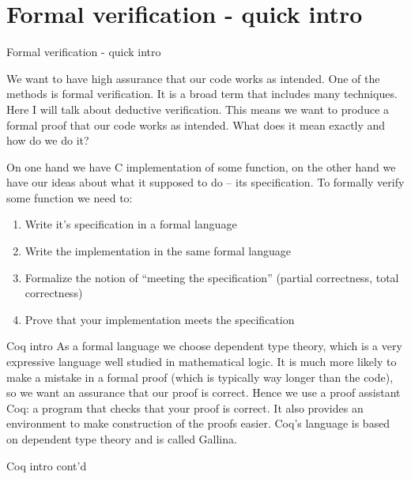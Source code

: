 \documentclass{beamer}
\begin{document}
\section{Formal verification - quick intro}
\begin{frame}{Formal verification - quick intro}
 
  We want to have high assurance that our code works as intended. One of the methods is formal verification. It is a broad term that includes many techniques. Here I will talk about deductive verification. This means we want to produce a formal proof that our code works as intended. What does it mean exactly and how do we do it?
  
  \bigskip
  
   On one hand we have C implementation of some function,
   on the other hand we have our ideas about what it supposed to do -- its specification. To formally verify some function we need to:
   
  \begin{enumerate}
  \item Write it's specification in a formal language  
  \item Write the implementation in the same formal language
  \item Formalize the notion of ``meeting the specification'' (partial correctness, total correctness)
  \item Prove that your implementation meets the specification
  \end{enumerate}
\end{frame}

\begin{frame}{Coq intro}
 As a formal language we choose dependent type theory, which is a very expressive language well studied in mathematical logic. It is much more likely to make a mistake in a formal proof (which is typically way longer than the code), so we want an assurance that our proof is correct. Hence we use a proof assistant Coq: a program that checks that your proof is correct. It also provides an environment to make construction of the proofs easier. Coq's language is based on dependent type theory and is called Gallina.
  
\end{frame}
\begin{frame}{Coq intro cont'd}
  
 
  
  \end{frame}
\end{document}
